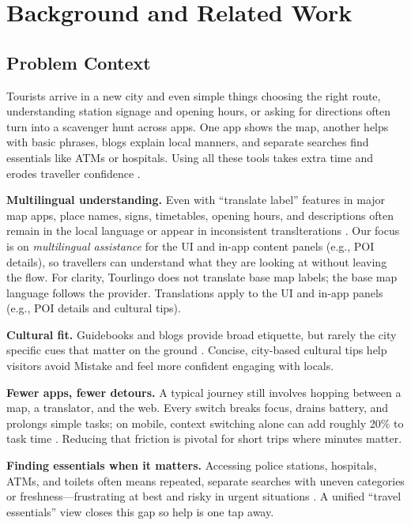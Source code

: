 \chapter{Background and Related Work}
\begin{sloppypar}

\section{Problem Context}
Tourists arrive in a new city and even simple things choosing the right route, understanding station signage and opening hours, or asking for directions often turn into a scavenger hunt across apps. One app shows the map, another helps with basic phrases, blogs explain local manners, and separate searches find essentials like ATMs or hospitals. Using all these tools takes extra time and erodes traveller confidence \cite{mobileit2024}.

\noindent \textbf{Multilingual understanding.}
Even with “translate label” features in major map apps, place names, signs, timetables, opening hours, and descriptions often remain in the local language or appear in inconsistent translterations \cite{googlemaps,applemaps}. Our focus is on \emph{multilingual assistance} for the UI and in-app content panels (e.g., POI details), so travellers can understand what they are looking at without leaving the flow. For clarity, Tourlingo does not translate base map labels; the base map language follows the provider. Translations apply to the UI and in-app panels (e.g., POI details and cultural tips).

\medskip

\noindent \textbf{Cultural fit.}
Guidebooks and blogs provide broad etiquette, but rarely the city specific cues that matter on the ground \cite{lonelyplanet,culturetrip}. Concise, city-based cultural tips help visitors avoid Mistake and feel more confident engaging with locals.

\medskip

\noindent \textbf{Fewer apps, fewer detours.}
A typical journey still involves hopping between a map, a translator, and the web. Every switch breaks focus, drains battery, and prolongs simple tasks; on mobile, context switching alone can add roughly 20\% to task time \cite{mobileit2024}. Reducing that friction is pivotal for short trips where minutes matter.

\medskip

\noindent \textbf{Finding essentials when it matters.}
Accessing police stations, hospitals, ATMs, and toilets often means repeated, separate searches with uneven categories or freshness—frustrating at best and risky in urgent situations \cite{googlemaps}. A unified “travel essentials” view closes this gap so help is one tap away.


\end{sloppypar}
